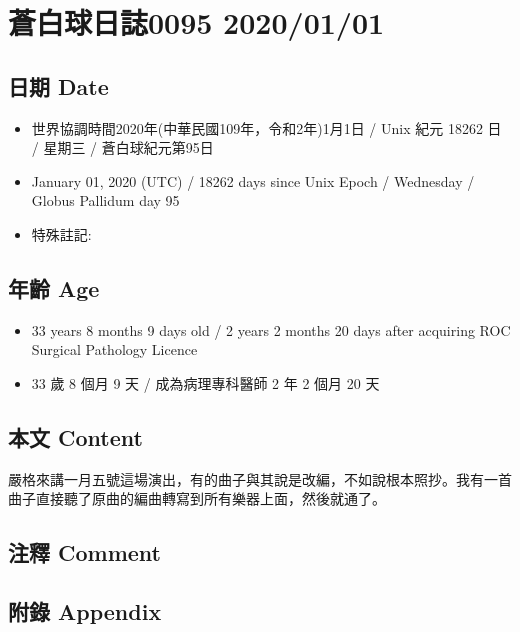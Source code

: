 \documentclass[
]{article}
\date{}
\providecommand{\tightlist}{%
  \setlength{\itemsep}{0pt}\setlength{\parskip}{0pt}}
\begin{document}
\hypertarget{ux84bcux767dux7403ux65e5ux8a8c0095-20200101}{%
\section{蒼白球日誌0095
2020/01/01}\label{ux84bcux767dux7403ux65e5ux8a8c0095-20200101}}

\hypertarget{ux65e5ux671f-date}{%
\subsection{日期 Date}\label{ux65e5ux671f-date}}

\begin{itemize}
\tightlist
\item
  世界協調時間2020年(中華民國109年，令和2年)1月1日 / Unix 紀元 18262 日
  / 星期三 / 蒼白球紀元第95日
\item
  January 01, 2020 (UTC) / 18262 days since Unix Epoch / Wednesday /
  Globus Pallidum day 95
\item
  特殊註記:
\end{itemize}

\hypertarget{ux5e74ux9f61-age}{%
\subsection{年齡 Age}\label{ux5e74ux9f61-age}}

\begin{itemize}
\tightlist
\item
  33 years 8 months 9 days old / 2 years 2 months 20 days after
  acquiring ROC Surgical Pathology Licence
\item
  33 歲 8 個月 9 天 / 成為病理專科醫師 2 年 2 個月 20 天
\end{itemize}

\hypertarget{ux672cux6587-content}{%
\subsection{本文 Content}\label{ux672cux6587-content}}

嚴格來講一月五號這場演出，有的曲子與其說是改編，不如說根本照抄。我有一首曲子直接聽了原曲的編曲轉寫到所有樂器上面，然後就通了。

\hypertarget{ux6ce8ux91cb-comment}{%
\subsection{注釋 Comment}\label{ux6ce8ux91cb-comment}}

\hypertarget{ux9644ux9304-appendix}{%
\subsection{附錄 Appendix}\label{ux9644ux9304-appendix}}
\end{document}
